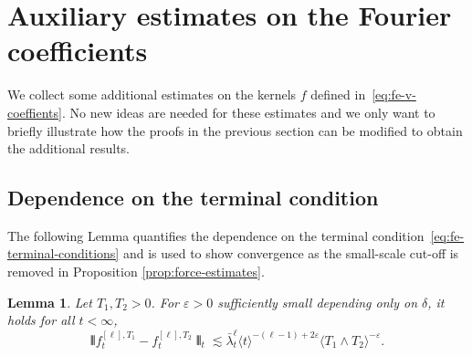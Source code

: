 \documentclass[11pt, a4paper]{scrartcl}
\numberwithin{equation}{section}
\theoremstyle{plain}
\newtheorem{lemma}[foo]{Lemma}
\theoremstyle{remark}
\begin{document}
   \section{Auxiliary estimates on the Fourier coefficients}
   We collect some additional estimates on the kernels $f$ defined
   in~\eqref{eq:fe-v-coeffients}. No new ideas are needed for these estimates and
   we only want to briefly illustrate how the proofs in the previous section can
   be modified to obtain the additional results.
   
   \subsection{Dependence on the terminal condition}
   
   The following Lemma quantifies the dependence on the terminal
   condition~\eqref{eq:fe-terminal-conditions} and is used to show convergence as
   the small-scale cut-off is removed in Proposition \ref{prop:force-estimates}.
   
   \begin{lemma}
     \label{lem:coeff-T-dependence}Let $T_1,T_2>0$. For $\varepsilon>0$ sufficiently small 
     depending only on $\delta$, it holds for all $t < \infty$,
     \begin{equation}
       \interleave f^{[\ell], T_1}_t - f_t^{[\ell], T_2} \interleave_t \lesssim
       \bar{\lambda}_t^{\ell} \langle t\rangle^{- (\ell - 1) + 2 \varepsilon} \langle T_1 \wedge T_2
       \rangle^{- \varepsilon} . \label{eq:coeff-T-dependence}
     \end{equation}
   \end{lemma}
   
\end{document}
